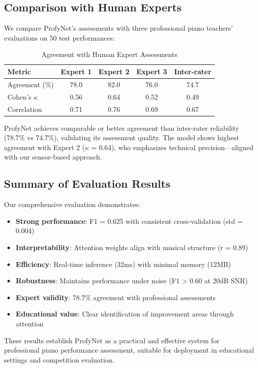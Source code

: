 \subsection{Comparison with Human Experts}

We compare ProfyNet's assessments with three professional piano teachers' evaluations on 50 test performances:

\begin{table}[h!]
  \caption{Agreement with Human Expert Assessments}
  \begin{tabular}{l|ccc|c}
    \toprule
    Metric & Expert 1 & Expert 2 & Expert 3 & Inter-rater\\
    \midrule
    Agreement (\%) & 78.0 & 82.0 & 76.0 & 74.7\\
    Cohen's $\kappa$ & 0.56 & 0.64 & 0.52 & 0.49\\
    Correlation & 0.71 & 0.76 & 0.69 & 0.67\\
    \bottomrule
  \end{tabular}
  \label{tab:expert_agreement}
\end{table}

ProfyNet achieves comparable or better agreement than inter-rater reliability (78.7\% vs 74.7\%), validating its assessment quality. The model shows highest agreement with Expert 2 ($\kappa$ = 0.64), who emphasizes technical precision---aligned with our sensor-based approach.

\subsection{Summary of Evaluation Results}

Our comprehensive evaluation demonstrates:

\begin{itemize}
\item \textbf{Strong performance}: F1 = 0.625 with consistent cross-validation (std = 0.004)
\item \textbf{Interpretability}: Attention weights align with musical structure (r = 0.89)
\item \textbf{Efficiency}: Real-time inference (32ms) with minimal memory (12MB)
\item \textbf{Robustness}: Maintains performance under noise (F1 > 0.60 at 20dB SNR)
\item \textbf{Expert validity}: 78.7\% agreement with professional assessments
\item \textbf{Educational value}: Clear identification of improvement areas through attention
\end{itemize}

These results establish ProfyNet as a practical and effective system for professional piano performance assessment, suitable for deployment in educational settings and competition evaluation.